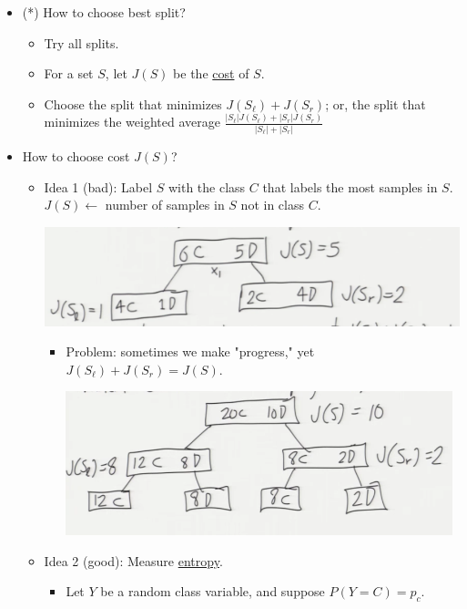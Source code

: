 \documentclass[10pt]{article}
\begin{document}
	\begin{itemize}
		\item (*) How to choose best split?
			\begin{itemize}
				\item Try all splits.
				\item For a set $S$, let $J(S)$ be the \underline{cost} of $S$.
				\item Choose the split that minimizes $J(S_{\ell}) + J(S_{r})$; or, the split that minimizes the weighted average $\frac{|S_{\ell}|J(S_{\ell})+ |S_{r}|J(S_{r})}{|S_{\ell}| + |S_{r}|}$
			\end{itemize}
		\item How to choose cost $J(S)$?
			\begin{itemize}
				\item Idea 1 (bad): Label $S$ with the class $C$ that labels the most samples in $S$. $J(S) \leftarrow$ number of samples in $S$ not in class $C$.
				\begin{center}
					\includegraphics[scale=0.6]{images/idea1good}
				\end{center}
				\begin{itemize}
					\item Problem: sometimes we make "progress," yet $J(S_{\ell}) + J(S_{r}) = J(S)$.
				\begin{center}
					\includegraphics[scale=0.6]{images/idea1bad}
				\end{center}
				\end{itemize}
				\item Idea 2 (good): Measure \underline{entropy}.
				\begin{itemize}
					\item Let $Y$ be a random class variable, and suppose $P(Y=C) = p_{c}$.

\end{itemize}
\end{itemize}
\end{itemize}
\end{document}
